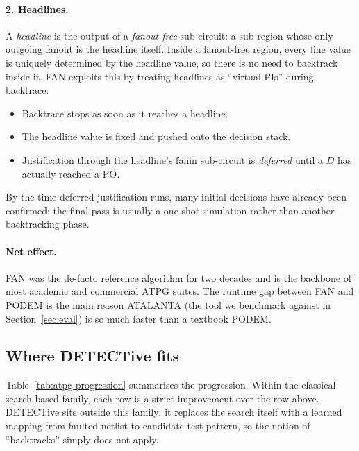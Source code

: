 \documentclass[11pt,a4paper]{article}
\begin{document}
\paragraph{2. Headlines.} A \emph{headline} is the output of a
\emph{fanout-free} sub-circuit: a sub-region whose only outgoing fanout
is the headline itself. Inside a fanout-free region, every line value
is uniquely determined by the headline value, so there is no need to
backtrack inside it. FAN exploits this by treating headlines as
``virtual PIs'' during backtrace:
\begin{itemize}[leftmargin=*,itemsep=2pt]
  \item Backtrace stops as soon as it reaches a headline.
  \item The headline value is fixed and pushed onto the decision stack.
  \item Justification through the headline's fanin sub-circuit is
        \emph{deferred} until a $D$ has actually reached a PO.
\end{itemize}
By the time deferred justification runs, many initial decisions have
already been confirmed; the final pass is usually a one-shot
simulation rather than another backtracking phase.

\paragraph{Net effect.} FAN was the de-facto reference algorithm for
two decades and is the backbone of most academic and commercial ATPG
suites. The runtime gap between FAN and PODEM is the main reason
ATALANTA (the tool we benchmark against in
Section~\ref{sec:eval}) is so much faster than a textbook PODEM.

\subsection{Where DETECTive fits}
\label{sec:classical-vs-detective}

Table~\ref{tab:atpg-progression} summarises the progression. Within
the classical search-based family, each row is a strict improvement
over the row above. DETECTive sits outside this family: it replaces
the search itself with a learned mapping from faulted netlist to
candidate test pattern, so the notion of ``backtracks'' simply does
not apply.
\end{document}
